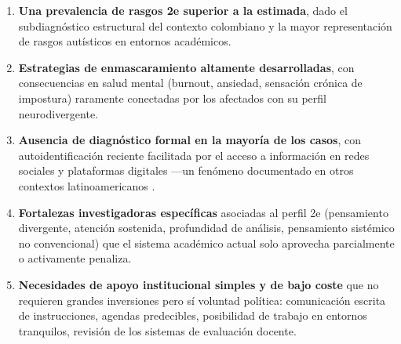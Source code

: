 \begin{enumerate}[leftmargin=*, itemsep=3pt]
    \item \textbf{Una prevalencia de rasgos 2e superior a la estimada}, dado el
    subdiagnóstico estructural del contexto colombiano y la mayor representación
    de rasgos autísticos en entornos académicos.
    \item \textbf{Estrategias de enmascaramiento altamente desarrolladas}, con
    consecuencias en salud mental (burnout, ansiedad, sensación crónica de
    impostura) raramente conectadas por los afectados con su perfil neurodivergente.
    \item \textbf{Ausencia de diagnóstico formal en la mayoría de los casos},
    con autoidentificación reciente facilitada por el acceso a información en
    redes sociales y plataformas digitales —un fenómeno documentado en otros
    contextos latinoamericanos \parencite{pessoa2026}.
    \item \textbf{Fortalezas investigadoras específicas} asociadas al perfil 2e
    (pensamiento divergente, atención sostenida, profundidad de análisis,
    pensamiento sistémico no convencional) que el sistema académico actual
    solo aprovecha parcialmente o activamente penaliza.
    \item \textbf{Necesidades de apoyo institucional simples y de bajo coste}
    que no requieren grandes inversiones pero sí voluntad política:
    comunicación escrita de instrucciones, agendas predecibles, posibilidad de
    trabajo en entornos tranquilos, revisión de los sistemas de evaluación docente.
\end{enumerate}


